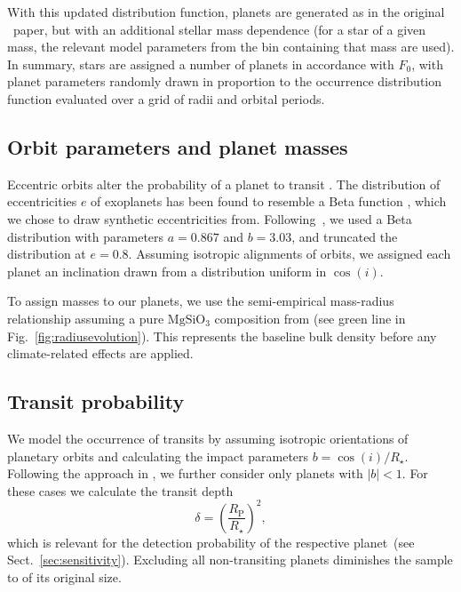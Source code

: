 \documentclass[twocolumn]{aastex631}
\begin{document}
With this updated distribution function, planets are generated as in the original \bioverse\ paper, but with an additional stellar mass dependence (for a star of a given mass, the relevant model parameters from the bin containing that mass are used). In summary, stars are assigned a number of planets in accordance with $F_0$, with planet parameters randomly drawn in proportion to the occurrence distribution function evaluated over a grid of radii and orbital periods.

\subsection{Orbit parameters and planet masses}\label{sec:met-orbits_masses}
Eccentric orbits alter the probability of a planet to transit \citep[e.g.,][]{Barnes2007a}.
The distribution of eccentricities $e$ of exoplanets has been found to resemble a Beta function \citep{Kipping2013b}, which we chose to draw synthetic eccentricities from.
Following~\citet{Kipping2013b}, we used a Beta distribution with parameters $a=0.867$ and $b=3.03$, and truncated the distribution at $e = 0.8$.
Assuming isotropic alignments of orbits, we assigned each planet an inclination drawn from a distribution uniform in $\cos(i)$.

To assign masses to our planets, we use the semi-empirical mass-radius relationship assuming a pure $\mathrm{MgSiO_3}$ composition from \citet{Zeng2016} (see green line in Fig.~\ref{fig:radiusevolution}).
This represents the baseline bulk density before any climate-related effects are applied.


\subsection{Transit probability}
We model the occurrence of transits by assuming isotropic orientations of planetary orbits and calculating the impact parameters $b = \cos(i)/R_\star$.
Following the approach in \citet{Bixel2021}, we further consider only planets with $|b| < 1$.
For these cases we calculate the transit depth
\begin{equation}\label{eq:transitdepth}
    \delta = \left( \frac{R_\mathrm{P}}{R_\star} \right)^2,
\end{equation}
which is relevant for the detection probability of the respective planet~(see Sect.~\ref{sec:sensitivity}).
Excluding all non-transiting planets diminishes the sample to  of its original size.
\end{document}
